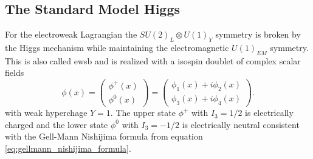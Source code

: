 \subsection*{The Standard Model Higgs}
For the electroweak Lagrangian the $SU(2)_L \otimes U(1)_Y$ symmetry is broken by the Higgs mechanism while maintaining the electromagnetic $U(1)_{EM}$ symmetry. This is also called \ac{ewsb} and is realized with a isospin doublet of complex scalar fields
\begin{equation}
    \phi(x)=
    \begin{pmatrix}
        \phi^+(x) \\
        \phi^0(x)
    \end{pmatrix}
    =
    \begin{pmatrix}
        \phi_1 (x)+i \phi_2 (x) \\
        \phi_3 (x)+i \phi_4 (x)
    \end{pmatrix}.
\end{equation}
with weak hyperchage $Y=1$. The upper state $\phi^+$ with $I_3=1/2$ is electrically charged and the lower state $\phi^0$ with $I_3=-1/2$ is electrically neutral consistent with the Gell-Mann Nishijima formula from equation \ref{eq:gellmann_nishijima_formula}.


